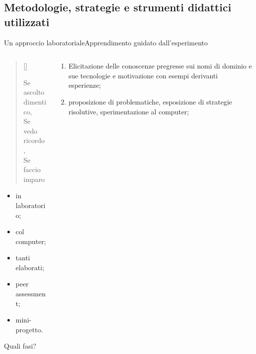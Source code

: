 \documentclass[italian]{beamer}
\begin{document}
\subsection[Strategie\ldots]{Metodologie, strategie e strumenti didattici utilizzati}

\begin{frame}[fragile]{Un approccio laboratoriale}{Apprendimento guidato dall'esperimento}
	
	\begin{columns}
		\begin{column}{0.3\textwidth}
			
			\newcommand{\autore}[1]{%
				\nopagebreak{\raggedleft\footnotesize #1\par}}
				
			\settowidth{\versewidth}{Se ascolto dimentico,}
			{\color{green!50!black}	
			\begin{verse}[\versewidth]
			\begin{altverse}
				Se ascolto dimentico,\\
				Se vedo ricordo,\\
				Se faccio imparo\\
				\autore{Confucio}
			\end{altverse}
			\end{verse}
			}
			
			\vfill
			
			\begin{itemize}
				\item in laboratorio;
				\item col computer;
				\item tanti elaborati;
				\item peer assessment;
				\item mini-progetto.
			\end{itemize}
			
			Quali fasi?
						
		\end{column}
		
		\begin{column}{0.7\textwidth}
			
			\begin{enumerate}
				\item Elicitazione delle conoscenze pregresse sui nomi di dominio e sue tecnologie e motivazione con esempi derivanti esperienze;
				
				\item proposizione di problematiche, esposizione di strategie risolutive, sperimentazione al computer;
				

\end{enumerate}
\end{column}
\end{columns}
\end{frame}
\end{document}
